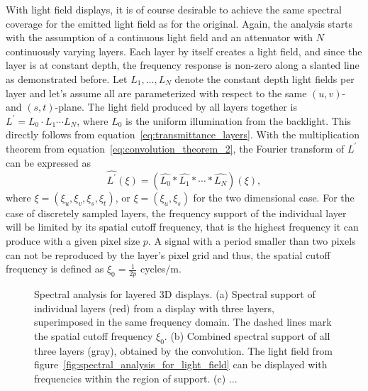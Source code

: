 With light field displays, it is of course desirable to achieve the same spectral coverage for the emitted light field as for the original.
Again, the analysis starts with the assumption of a continuous light field and an attenuator with $N$ continuously varying layers.
Each layer by itself creates a light field, and since the layer is at constant depth, the frequency response is non-zero along a slanted line as demonstrated before.
Let $L_1, \dots , L_N$ denote the constant depth light fields per layer and let's assume all are parameterized with respect to the same $(u, v)$- and \mbox{$(s, t)$-plane}.
The light field produced by all layers together is $L^\prime = L_0 \cdot L_1 \cdots L_N$, where $L_0$ is the uniform illumination from the backlight.
This directly follows from equation~\ref{eq:transmittance_layers}.
With the multiplication theorem from equation~\ref{eq:convolution_theorem_2}, the Fourier transform of $L^\prime$ can be expressed as
\begin{equation}\label{eq:convolution_of_layers}
	\widehat{L^\prime}(\xi) = (\widehat{L_0} \ast \widehat{L_1} \ast \cdots \ast \widehat{L_N}) (\xi), 
\end{equation}
where $\xi = (\xi_u, \xi_v, \xi_s, \xi_t)$, or $\xi = (\xi_u, \xi_s)$ for the two dimensional case.
For the case of discretely sampled layers, the frequency support of the individual layer will be limited by its spatial cutoff frequency, that is the highest frequency it can produce with a given pixel size $p$.
A signal with a period smaller than two pixels can not be reproduced by the layer's pixel grid and thus, the spatial cutoff frequency is defined as $\xi_0 = \frac{1}{2p}$ cycles/m.
\begin{figure}[tb]
	\begin{subfigure}[b]{.3\textwidth}
		\centering
		
		\caption{}
		\label{fig:3_layers}
		
		\caption{}
		\label{fig:3_layes_convolution}
	\end{subfigure}%
	\hfill
	\begin{subfigure}[b]{.7\textwidth}
		\centering
		
		\caption{}
		\label{fig:cut-off-frequency_N_layers}
	\end{subfigure}%
	\caption[Spectral analysis for layered 3D displays]
	{Spectral analysis for layered 3D displays. 
		(a) Spectral support of individual layers (red) from a display with three layers, superimposed in the same frequency domain.
		The dashed lines mark the spatial cutoff frequency $\xi_0$.
		(b) Combined spectral support of all three layers (gray), obtained by the convolution. 
		The light field from figure~\ref{fig:spectral_analysis_for_light_field} can be displayed with frequencies within the region of support.
		(c) ...}
\end{figure}
